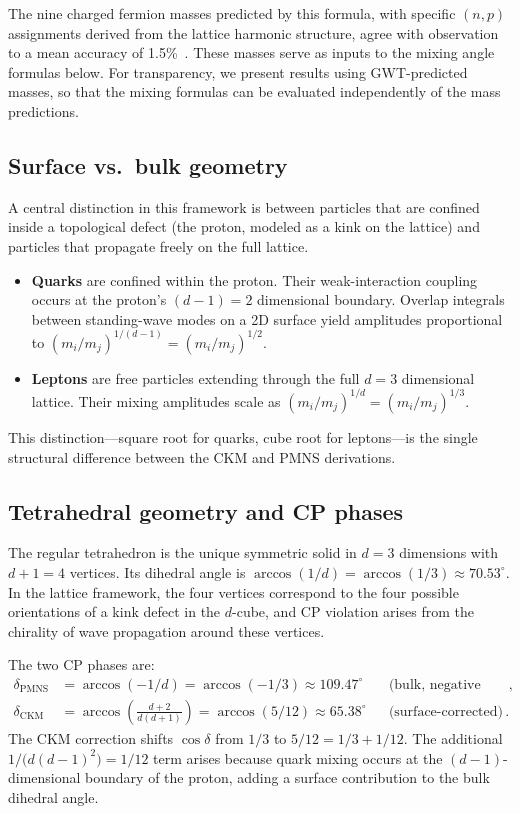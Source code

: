 \documentclass[12pt,a4paper]{article}
\begin{document}
The nine charged fermion masses predicted by this formula, with specific $(n,p)$ assignments derived from the lattice harmonic structure, agree with observation to a mean accuracy of 1.5\%~\cite{sturm2026}. These masses serve as inputs to the mixing angle formulas below. For transparency, we present results using GWT-predicted masses, so that the mixing formulas can be evaluated independently of the mass predictions.

\subsection{Surface vs.\ bulk geometry}

A central distinction in this framework is between particles that are confined inside a topological defect (the proton, modeled as a kink on the lattice) and particles that propagate freely on the full lattice.

\begin{itemize}[nosep]
  \item \textbf{Quarks} are confined within the proton. Their weak-interaction coupling occurs at the proton's $(d{-}1)=2$ dimensional boundary. Overlap integrals between standing-wave modes on a 2D surface yield amplitudes proportional to $(m_i/m_j)^{1/(d-1)}=(m_i/m_j)^{1/2}$.
  \item \textbf{Leptons} are free particles extending through the full $d=3$ dimensional lattice. Their mixing amplitudes scale as $(m_i/m_j)^{1/d}=(m_i/m_j)^{1/3}$.
\end{itemize}

This distinction---square root for quarks, cube root for leptons---is the single structural difference between the CKM and PMNS derivations.

\subsection{Tetrahedral geometry and CP phases}

The regular tetrahedron is the unique symmetric solid in $d=3$ dimensions with $d+1=4$ vertices. Its dihedral angle is $\arccos(1/d)=\arccos(1/3)\approx 70.53^\circ$. In the lattice framework, the four vertices correspond to the four possible orientations of a kink defect in the $d$-cube, and CP violation arises from the chirality of wave propagation around these vertices.

The two CP phases are:
\begin{align}
  \delta_{\mathrm{PMNS}} &= \arccos(-1/d) = \arccos(-1/3) \approx 109.47^\circ
    &&\text{(bulk, negative handedness)}\,,
    \label{eq:delta_pmns}\\[4pt]
  \delta_{\mathrm{CKM}} &= \arccos\!\left(\frac{d+2}{d(d+1)}\right) = \arccos(5/12) \approx 65.38^\circ
    &&\text{(surface-corrected)}\,.
    \label{eq:delta_ckm}
\end{align}
The CKM correction shifts $\cos\delta$ from $1/3$ to $5/12 = 1/3+1/12$. The additional $1/\bigl(d(d{-}1)^2\bigr)=1/12$ term arises because quark mixing occurs at the $(d{-}1)$-dimensional boundary of the proton, adding a surface contribution to the bulk dihedral angle.
\end{document}
